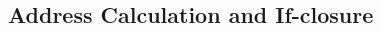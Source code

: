 \begin{definition}
\begin{minipage}{1.0\linewidth}
\begin{multicols}{2}
  \end{multicols}
  \end{minipage}
\end{definition}

\subsection{Address Calculation and If-closure}
\label{sec:semcaaddr}

